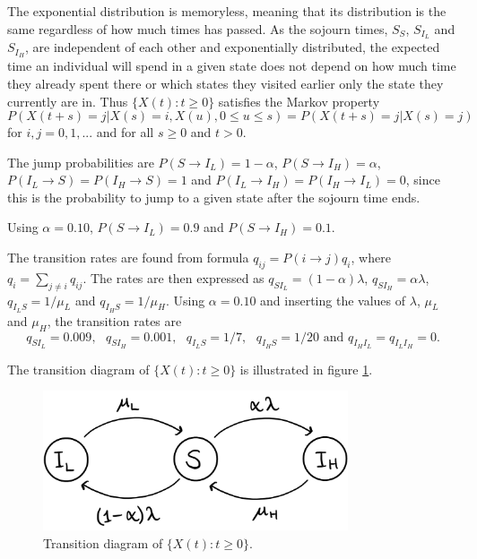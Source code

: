 
The exponential distribution is memoryless, meaning that its distribution is the same regardless of how much times has passed. As the sojourn times, $S_S$, $S_{I_L}$ and $S_{I_H}$, are independent of each other and exponentially distributed, the expected time an individual will spend in a given state does not depend on how much time they already spent there or which states they visited earlier only the state they currently are in. Thus $\{X(t):t \geq 0 \}$  satisfies the Markov property
$$P(X(t+s)=j|X(s)=i, X(u), 0 \leq u \leq s)=P(X(t+s)=j|X(s)=j)$$ 
for $i,j = 0,1,...$ and for all $s \geq 0$ and $t >0 $.

The jump probabilities are $P(S \rightarrow I_L)= 1 - \alpha$, $P(S \rightarrow I_H)= \alpha$, $P(I_L \rightarrow S)= P(I_H \rightarrow S) = 1$ and $P(I_L \rightarrow I_H)= P(I_H \rightarrow I_L) = 0$, since this is the probability to jump to a given state after the sojourn time ends.

Using $\alpha = 0.10$, $P(S \rightarrow I_L)= 0.9$ and $P(S \rightarrow I_H)= 0.1$. 

The transition rates are found from formula $q_{ij} = P(i \rightarrow j ) q_i$, where $q_i = \sum_{j \neq i} q_{ij}$. The rates are then expressed as $q_{SI_L} = (1-\alpha)\lambda $, $q_{SI_H} = \alpha \lambda$, $q_{I_LS} = 1/\mu_L$ and $q_{I_HS} = 1/\mu_H$. Using $\alpha = 0.10$ and inserting the values of $\lambda$, $\mu_L$ and $\mu_H$, the transition rates are 
$$q_{SI_L} = 0.009,\text{ } q_{SI_H} = 0.001, \text{ } q_{I_LS} = 1/7, \text{ } q_{I_HS} = 1/20 \text{ and } q_{I_HI_L}=q_{I_LI_H}=0.$$

The transition diagram of $\{X(t):t \geq 0 \}$ is illustrated in figure \ref{transdiagramA}. 

\begin{figure}
    \centering
    \includegraphics[width=90mm]{TransDiag1A.png}
    \caption{Transition diagram of $\{X(t):t\geq0\}$.}
    \label{transdiagramA}
\end{figure}





